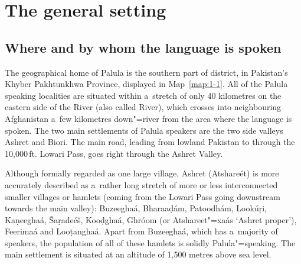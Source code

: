 \section{The general setting}
\label{sec:1-2}
\subsection{Where and by whom the language is spoken}
\label{subsec:1-2-1}

The geographical home of Palula is the southern part of \iliChitral district, in Pakistan's Khyber Pakhtunkhwa Province, displayed in Map~\ref{map:1-1}. All of the Palula speaking localities are
situated within a~stretch of only 40 kilometres on the eastern side of the \iliKunar River (also called
\iliChitral River), which crosses into neighbouring Afghanistan a~few kilometres down"=river from the
area where the language is spoken. The two main settlements of Palula speakers are the two side valleys Ashret and Biori. The main road, leading from lowland Pakistan to \iliChitral through the 10,000\,ft. Lowari Pass, goes right through the Ashret Valley. 


Although formally regarded as one large village, Ashret (Atshareét) is more accurately described as a~rather long stretch of more or less interconnected smaller villages or hamlets (coming from the Lowari Pass going downstream towards the main valley): Buzeeghaá, Bharaaḍám, Patoodhám, Lookúṛi, Kaṇeeghaá, Šaṛadeéš, Kooḍghaá, Ghróom (or Atshareet"=xaás `Ashret proper'), Feerimaá and Looṭanghaá. Apart from Buzeeghaá, which has a~majority of \iliPashto speakers, the population of all of these hamlets is solidly Palula"=speaking. The main settlement is situated at an altitude of 1,500 metres above sea level.

